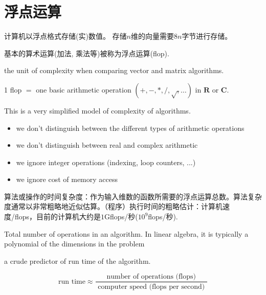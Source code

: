 \section{浮点运算}

计算机以浮点格式存储(实)数值。 存储$n$维的向量需要$8n$字节进行存储。

基本的算术运算(加法, 乘法等)被称为浮点运算(flop). 

\begin{definition}
    the unit of complexity when comparing vector and matrix algorithms.

    1 flop $ = $ one basic arithmetic operation $ (+,-, *, /, \sqrt{,} \ldots) $ in $ \mathbf{R} $ or $ \mathbf{C} $.
\end{definition}

\begin{remark}
    This is a very simplified model of complexity of algorithms.

    \begin{itemize}
        \item we don't distinguish between the different types of arithmetic operations
        \item we don't distinguish between real and complex arithmetic
        \item we ignore integer operations (indexing, loop counters, ...)
        \item we ignore cost of memory access
    \end{itemize}
\end{remark}

算法或操作的时间复杂度：作为输入维数的函数所需要的浮点运算总数。算法复杂度通常以非常粗略地近似估算。（程序）执行时间的粗略估计：计算机速度/flops，目前的计算机大约是$1$Gflops/秒($10^9$flops/秒).

\begin{definition}
    Total number of operations in an algorithm. In linear algebra, it is typically a polynomial of the dimensions in the problem

\end{definition}
\begin{theorem}[通过浮点运算次数大致预测程序的运行时间]
    a crude predictor of run time of the algorithm.

    $$\text{run time}  \approx \frac{\text { number of operations (flops) }}{\text { computer speed (flops per second) }} $$
\end{theorem}

